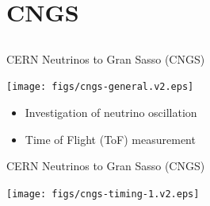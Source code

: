 \documentclass[compress,red]{beamer}
\begin{document}
\section{CNGS}
\subsection{}
\begin{frame}{CERN Neutrinos to Gran Sasso (CNGS)}

    \begin{center}
      \texttt{[image: figs/cngs-general.v2.eps]}
    \end{center}

    \begin{center}
      \begin{itemize}
	\item Investigation of neutrino oscillation
	\item Time of Flight (ToF) measurement
      \end{itemize}

    \end{center}


\end{frame}
\begin{frame}{CERN Neutrinos to Gran Sasso (CNGS)}

      \begin{center}
      
      \texttt{[image: figs/cngs-timing-1.v2.eps]} 
      \end{center}

\end{frame}
\end{document}
